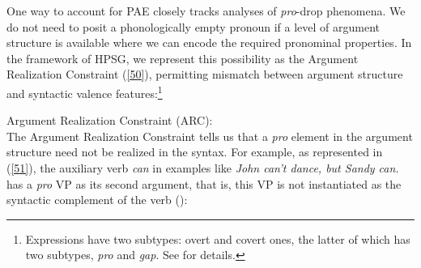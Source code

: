 {
\z
{}
\z
{}
\z
{}
\z
{}
\z
{}
\z
{}
\z

%


One way to account for PAE closely tracks analyses of {\it pro}-drop phenomena. We do not need to posit a phonologically empty pronoun if a level of argument structure is
available where we can encode the required pronominal properties\citep[see][]{Bresnan1982a,GSag2000a-u,Kim2006, Ginzburg2018}. In the framework of HPSG, we represent this possibility as the Argument Realization Constraint (\ref{50}), permitting mismatch between argument structure and syntactic valence features:\footnote{Expressions have two subtypes: overt and covert ones, the latter of which has two subtypes, \textit{pro} and \textit{gap}. See \citet{Sag2012a} for details.}

\ea
\label{50}
Argument Realization Constraint (ARC):\\
 \impl
{}
\z
The Argument Realization Constraint tells us that a \textit{pro} element
in the argument structure need not be realized in the syntax.
 For
example, as represented in (\ref{51}), the auxiliary
verb \textit{can} in examples like \textit{John can't dance, but Sandy can.}
has a \textit{pro} VP as its second argument, that is, this VP is not instantiated as the syntactic
complement of the verb (\citealt{Kim2006}): %

}
